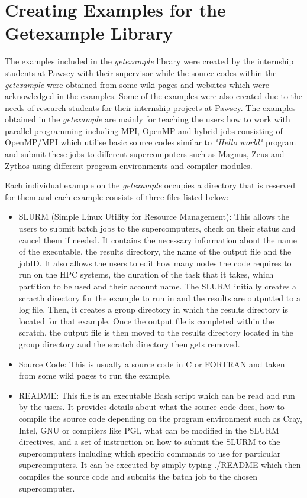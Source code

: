 \section{Creating Examples for the Getexample Library}

The examples included in the \emph{getexample} library were created by the internship students at Pawsey with their supervisor while the source codes within the
\emph{getexample} were obtained from some wiki pages and websites which were acknowledged in the examples. Some of the examples were also created due to the
needs of research students for their internship projects at Pawsey. The examples obtained in the \emph{getexample} are mainly for teaching the users how to work
with parallel programming including MPI, OpenMP and hybrid jobs consisting of OpenMP/MPI which utilise basic source codes similar to \emph{"Hello world"} 
program and submit these jobs to different supercomputers such as Magnus, Zeus and Zythos using different program environments and compiler modules. 

Each individual example on the \emph{getexample} occupies a directory that is reserved for them and each example consists of three files listed below:

\begin{itemize}    
\item SLURM (Simple Linux Utility for Resource Management): This allows the users to submit batch jobs to the supercomputers, check on their status and 
cancel them if needed. It contains the necessary information about the name of the executable, the results directory, the name of the output file and 
the jobID. It also allows the users to edit how many nodes the code requires to run on the HPC systems, the duration of the task that it takes, which 
partition to be used and their account name. The SLURM initially creates a scracth directory for the example to run in and the results are outputted to 
a log file. Then, it creates a group directory in which the results directory is located for that example. Once the output file is completed within the 
scratch, the output file is then moved to the results directory located in the group directory and the scratch directory then gets removed.
\item Source Code: This is usually a source code in C or FORTRAN and taken from some wiki pages to run the example.
\item README: This file is an executable Bash script which can be read and run by the users. It provides details about what the source code does,
how to compile the source code depending on the program environment such as Cray, Intel, GNU or compilers like PGI, what can be modified in the SLURM 
directives, and a set of instruction on how to submit the SLURM to the supercomputers including which specific commands to use for particular 
supercomputers. It can be executed by simply typing ./README which then compiles the source code and submits the batch job to the chosen supercomputer.
\end{itemize}

